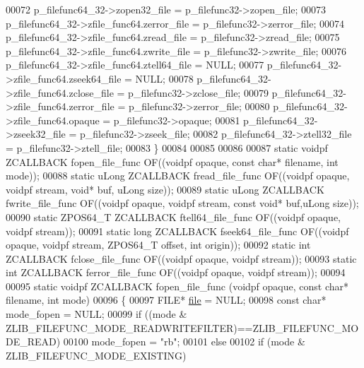 \begin{DoxyCode}
00072     p\_filefunc64\_32->zopen32\_file = p\_filefunc32->zopen\_file;
00073     p\_filefunc64\_32->zfile\_func64.zerror\_file = p\_filefunc32->zerror\_file;
00074     p\_filefunc64\_32->zfile\_func64.zread\_file = p\_filefunc32->zread\_file;
00075     p\_filefunc64\_32->zfile\_func64.zwrite\_file = p\_filefunc32->zwrite\_file;
00076     p\_filefunc64\_32->zfile\_func64.ztell64\_file = NULL;
00077     p\_filefunc64\_32->zfile\_func64.zseek64\_file = NULL;
00078     p\_filefunc64\_32->zfile\_func64.zclose\_file = p\_filefunc32->zclose\_file;
00079     p\_filefunc64\_32->zfile\_func64.zerror\_file = p\_filefunc32->zerror\_file;
00080     p\_filefunc64\_32->zfile\_func64.opaque = p\_filefunc32->opaque;
00081     p\_filefunc64\_32->zseek32\_file = p\_filefunc32->zseek\_file;
00082     p\_filefunc64\_32->ztell32\_file = p\_filefunc32->ztell\_file;
00083 \}
00084 
00085 
00086 
00087 \textcolor{keyword}{static} voidpf  ZCALLBACK fopen\_file\_func OF((voidpf opaque, \textcolor{keyword}{const} \textcolor{keywordtype}{char}* filename, \textcolor{keywordtype}{int} mode));
00088 \textcolor{keyword}{static} uLong   ZCALLBACK fread\_file\_func OF((voidpf opaque, voidpf stream, \textcolor{keywordtype}{void}* buf, uLong size));
00089 \textcolor{keyword}{static} uLong   ZCALLBACK fwrite\_file\_func OF((voidpf opaque, voidpf stream, \textcolor{keyword}{const} \textcolor{keywordtype}{void}* buf,uLong size));
00090 \textcolor{keyword}{static} ZPOS64\_T ZCALLBACK ftell64\_file\_func OF((voidpf opaque, voidpf stream));
00091 \textcolor{keyword}{static} \textcolor{keywordtype}{long}    ZCALLBACK fseek64\_file\_func OF((voidpf opaque, voidpf stream, ZPOS64\_T offset, \textcolor{keywordtype}{int} origin));
00092 \textcolor{keyword}{static} \textcolor{keywordtype}{int}     ZCALLBACK fclose\_file\_func OF((voidpf opaque, voidpf stream));
00093 \textcolor{keyword}{static} \textcolor{keywordtype}{int}     ZCALLBACK ferror\_file\_func OF((voidpf opaque, voidpf stream));
00094 
00095 \textcolor{keyword}{static} voidpf ZCALLBACK fopen\_file\_func (voidpf opaque, \textcolor{keyword}{const} \textcolor{keywordtype}{char}* filename, \textcolor{keywordtype}{int} mode)
00096 \{
00097     FILE* \hyperlink{structfile}{file} = NULL;
00098     \textcolor{keyword}{const} \textcolor{keywordtype}{char}* mode\_fopen = NULL;
00099     \textcolor{keywordflow}{if} ((mode & ZLIB\_FILEFUNC\_MODE\_READWRITEFILTER)==ZLIB\_FILEFUNC\_MODE\_READ)
00100         mode\_fopen = \textcolor{stringliteral}{"rb"};
00101     \textcolor{keywordflow}{else}
00102     \textcolor{keywordflow}{if} (mode & ZLIB\_FILEFUNC\_MODE\_EXISTING)

\end{DoxyCode}
